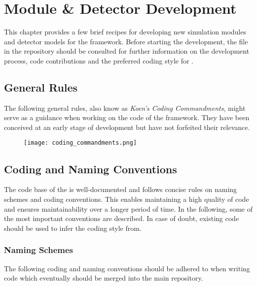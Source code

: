 \chapter{Module \& Detector Development}
\label{ch:development}

This chapter provides a few brief recipes for developing new simulation modules and detector models for the \apsq framework.
Before starting the development, the  file in the repository should be consulted for further information on the development process, code contributions and the preferred coding style for \apsq.

\section{General Rules}

The following general rules, also know as \emph{Koen's Coding Commandments}, might serve as a guidance when working on the code of the \apsq framework.
They have been conceived at an early stage of development but have not forfeited their relevance.

\begin{figure}[H]
  \centering
  \texttt{[image: coding\_commandments.png]}
\end{figure}

\section{Coding and Naming Conventions}

The code base of the \apsq is well-documented and follows concise rules on naming schemes and coding conventions.
This enables maintaining a high quality of code and ensures maintainability over a longer period of time.
In the following, some of the most important conventions are described.
In case of doubt, existing code should be used to infer the coding style from.

\subsection{Naming Schemes}

The following coding and naming conventions should be adhered to when writing code which eventually should be merged into the main repository.

